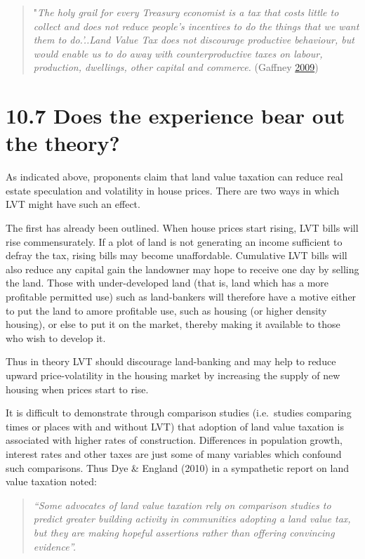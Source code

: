 \documentclass[]{tufte-handout}
\begin{document}
\begin{quote}
"\emph{The holy grail for every Treasury economist is a tax that costs
little to collect and does not reduce people's incentives to do the
things that we want them to do.'..Land Value Tax does not discourage
productive behaviour, but would enable us to do away with
counterproductive taxes on labour, production, dwellings, other capital
and commerce.} (Gaffney \protect\hyperlink{ref-Gaffney2009}{2009})
\end{quote}

\hypertarget{does-the-experience-bear-out-the-theory}{%
\section{10.7 Does the experience bear out the
theory?}\label{does-the-experience-bear-out-the-theory}}

As indicated above, proponents claim that land value taxation can reduce
real estate speculation and volatility in house prices. There are two
ways in which LVT might have such an effect.

The first has already been outlined. When house prices start rising, LVT
bills will rise commensurately. If a plot of land is not generating an
income sufficient to defray the tax, rising bills may become
unaffordable. Cumulative LVT bills will also reduce any capital gain the
landowner may hope to receive one day by selling the land. Those with
under-developed land (that is, land which has a more profitable
permitted use) such as land-bankers will therefore have a motive either
to put the land to amore profitable use, such as housing (or higher
density housing), or else to put it on the market, thereby making it
available to those who wish to develop it.

Thus in theory LVT should discourage land-banking and may help to reduce
upward price-volatility in the housing market by increasing the supply
of new housing when prices start to rise.

It is difficult to demonstrate through comparison studies (i.e.~studies
comparing times or places with and without LVT) that adoption of land
value taxation is associated with higher rates of construction.
Differences in population growth, interest rates and other taxes are
just some of many variables which confound such comparisons. Thus Dye \&
England (2010) in a sympathetic report on land value taxation noted:

\begin{quote}
\emph{``Some advocates of land value taxation rely on comparison studies
to predict greater building activity in communities adopting a land
value tax, but they are making hopeful assertions rather than offering
convincing evidence''.}
\end{quote}
\end{document}
